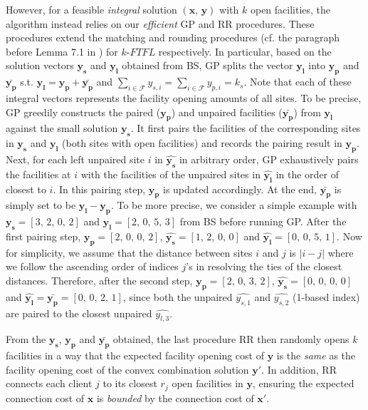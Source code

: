 \documentclass[10pt]{llncs}
\begin{document}
However, for a feasible \textit{integral} solution $\left(\boldsymbol{x},\,\boldsymbol{y}\right)$
with $k$ open facilities, the algorithm instead relies on our\textit{
efficient} GP and RR procedures. These procedures extend the matching
and rounding procedures (cf. the paragraph before Lemma 7.1 in \cite{Swamy08FTFL2.076})
for $k$-$FTFL$ respectively. In particular, based on the solution
vectors $\boldsymbol{y_{s}}$ and $\boldsymbol{y_{l}}$ obtained from
BS, GP splits the vector $\boldsymbol{y_{l}}$ into $\boldsymbol{y_{p}}$
and $\boldsymbol{\bar{y_{p}}}$ s.t. $\boldsymbol{y_{l}}=\boldsymbol{y_{p}}+\boldsymbol{\bar{y_{p}}}$
and $\sum_{i\in\mathcal{F}}y_{s,i}=\sum_{i\in\mathcal{F}}y_{p,i}=k_{s}$.
Note that each of these integral vectors represents the facility opening
amounts of all sites. To be precise, GP greedily constructs the paired
($\boldsymbol{y_{p}}$) and unpaired facilities ($\boldsymbol{\bar{y_{p}}}$)
from $\boldsymbol{y_{l}}$ against the small solution $\boldsymbol{y_{s}}$.
It first pairs the facilities of the corresponding sites in $\boldsymbol{y_{s}}$
and $\boldsymbol{y_{l}}$ (both sites with open facilities) and records
the pairing result in $\boldsymbol{y_{p}}$. Next, for each left unpaired
site $ $$i$ in $\boldsymbol{\hat{y_{s}}}$ in arbitrary order, GP
exhaustively pairs the facilities at $i$ with the facilities of the
unpaired sites in $\boldsymbol{\hat{y_{l}}}$ in the order of closest
to $i$. In this pairing step, $\boldsymbol{y_{p}}$ is updated accordingly.
At the end, $\boldsymbol{\bar{y_{p}}}$ is simply set to be $\boldsymbol{y_{l}}-\boldsymbol{y_{p}}$.
To be more precise, we consider a simple example with $\boldsymbol{y_{s}}=\left[3,\,2,\,0,\,2\right]$
and $\boldsymbol{y_{l}}=\left[2,\,0,\,5,\,3\right]$ from BS before
running GP. After the first pairing step, $\boldsymbol{y_{p}}=\left[2,\,0,\,0,\,2\right]$,
$\hat{\boldsymbol{y_{s}}}=\left[1,\,2,\,0,\,0\right]$ and $\hat{\boldsymbol{y_{l}}}=\left[0,\,0,\,5,\,1\right]$.
Now for simplicity, we assume that the distance between sites $i$
and $j$ is $\left|i-j\right|$ where we follow the ascending order
of indices $j$'s in resolving the ties of the closest distances.
Therefore, after the second step, $\boldsymbol{y_{p}}=\left[2,\,0,\,3,\,2\right]$,
$\hat{\boldsymbol{y_{s}}}=\left[0,\,0,\,0,\,0\right]$ and $\hat{\boldsymbol{y_{l}}}=\bar{\boldsymbol{y_{p}}}=\left[0,\,0,\,2,\,1\right]$,
since both the unpaired $\hat{y_{s,1}}$ and $\hat{y_{s,2}}$ (1-based
index) are paired to the closest unpaired $\hat{y_{l,3}}$.

From the $\boldsymbol{y_{s}}$, $\boldsymbol{y_{p}}$ and $\boldsymbol{\bar{y_{p}}}$
obtained, the last procedure RR then randomly opens $k$ facilities
in a way that the expected facility opening cost of $\boldsymbol{y}$
is the \textit{same} as the facility opening cost of the convex combination
solution $\boldsymbol{y'}$. In addition, RR connects each client
$j$ to its closest $r_{j}$ open facilities in $\boldsymbol{y}$,
ensuring the expected connection cost of $\boldsymbol{x}$ is\textit{
bounded} by the connection cost of $\boldsymbol{x'}$.
\end{document}
